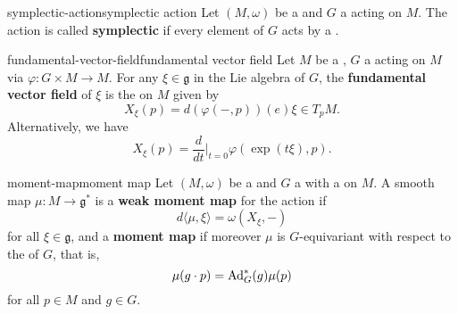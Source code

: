 \begin{topic}{symplectic-action}{symplectic action}
    Let $(M, \omega)$ be a  and $G$ a  acting on $M$. The action is called \textbf{symplectic} if every element of $G$ acts by a .
\end{topic}

\begin{topic}{fundamental-vector-field}{fundamental vector field}
    Let $M$ be a , $G$ a  acting on $M$ via $\varphi : G \times M \to M$. For any $\xi \in \mathfrak{g}$ in the Lie algebra of $G$, the \textbf{fundamental vector field} of $\xi$ is the  on $M$ given by
    \[ X_\xi(p) = d(\varphi(-, p))(e) \xi \in T_p M . \]
    Alternatively, we have
    \[ X_\xi(p) = \frac{d}{d t}\Big|_{t = 0} \varphi(\exp(t \xi), p) . \]
\end{topic}

\begin{topic}{moment-map}{moment map}
    Let $(M, \omega)$ be a  and $G$ a  with a  on $M$. A smooth map $\mu : M \to \mathfrak{g}^*$ is a \textbf{weak moment map} for the action if
    \[ d \langle \mu, \xi \rangle = \omega(X_\xi, -) \]
    for all $\xi \in \mathfrak{g}$, and a \textbf{moment map} if moreover $\mu$ is $G$-equivariant with respect to the  of $G$, that is,
    \[ \mu(g \cdot p) = \textup{Ad}_G^* (g) \mu(p) \]
    for all $p \in M$ and $g \in G$.
\end{topic}

